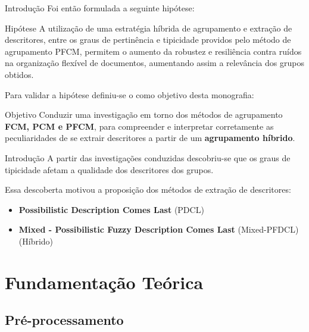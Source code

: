 \documentclass[brazil]{beamer}
\begin{document}
\begin{frame}{Introdução}
  Foi então formulada a seguinte hipótese: 
  \begin{block}{Hipótese}
    A utilização de uma estratégia \alert{híbrida} de agrupamento e extração de descritores, entre
    os graus de pertinência e tipicidade providos pelo método de agrupamento PFCM, permitem o
    aumento da robustez e resiliência contra \alert{ruídos} na \alert{organização flexível de
    documentos}, aumentando assim a relevância dos grupos obtidos.
  \end{block}

  Para validar a hipótese definiu-se o como objetivo desta monografia:

  \begin{block}{Objetivo}
    Conduzir uma investigação em torno dos métodos de agrupamento \textbf{FCM, PCM e PFCM}, para
    compreender e interpretar corretamente as peculiaridades de se extrair descritores a partir de um
    \textbf{agrupamento híbrido}.
  \end{block}
\end{frame}

\begin{frame}{Introdução}
  A partir das investigações conduzidas descobriu-se que os \alert{graus de tipicidade}
  \alert{afetam} a qualidade dos descritores dos grupos. 

  Essa descoberta motivou a proposição dos métodos de extração de descritores:

  \begin{itemize}
    \item \textbf{Possibilistic Description Comes Last} (PDCL)
    \item \textbf{Mixed - Possibilistic Fuzzy Description Comes Last} (Mixed-PFDCL) (Híbrido)
  \end{itemize} 
\end{frame}

\section{Fundamentação Teórica}

\subsection{Pré-processamento}
\end{document}
